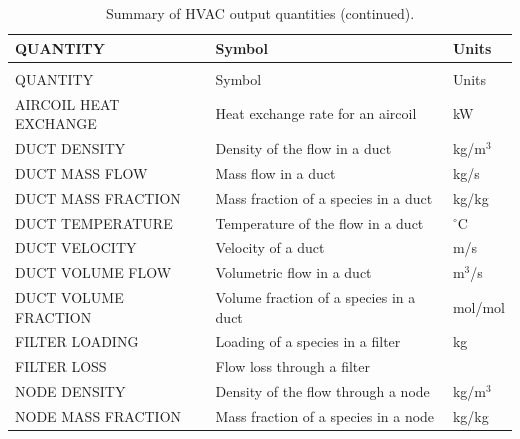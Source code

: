 \documentclass[11pt]{book}
\begin{document}
\begin{longtable}{|l|l|l|@{\extracolsep{\fill}}}
\caption[HVAC output quantities]{Summary of HVAC output quantities.}
\label{tab:hvacoutput} \\
\hline
{\ct QUANTITY}                                  & Symbol                                    & Units           \\
\hline \hline
\endfirsthead
\caption[]{Summary of HVAC output quantities (continued).} \\
\hline
{\ct QUANTITY}                                  & Symbol                                    & Units           \\
\hline \hline
\endhead
{\ct AIRCOIL HEAT EXCHANGE}                     & Heat exchange rate for an aircoil         &  kW                   \\ \hline
{\ct DUCT DENSITY}                              & Density of the flow in a duct             &  kg/m$^3$             \\ \hline
{\ct DUCT MASS FLOW}                            & Mass flow in a duct                       &  kg/s                 \\ \hline
{\ct DUCT MASS FRACTION}                        & Mass fraction of a species in a duct      &  kg/kg                \\ \hline
{\ct DUCT TEMPERATURE}                          & Temperature of the flow in a duct         & $^\circ$C             \\ \hline
{\ct DUCT VELOCITY}                             & Velocity of a duct                        &  m/s                  \\ \hline
{\ct DUCT VOLUME FLOW}                          & Volumetric flow in a duct                 &  m$^3$/s              \\ \hline
{\ct DUCT VOLUME FRACTION}                      & Volume fraction of a species in a duct    &  mol/mol              \\ \hline
{\ct FILTER LOADING}                            & Loading of a species in a filter          &  kg                   \\ \hline
{\ct FILTER LOSS}                               & Flow loss through a filter                &                       \\ \hline
{\ct NODE DENSITY}                              & Density of the flow through a node        &  kg/m$^3$             \\ \hline
{\ct NODE MASS FRACTION}                        & Mass fraction of a species in a node      &  kg/kg                \\ \hline

\end{longtable}
\end{document}
